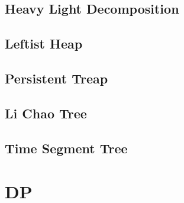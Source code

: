 \documentclass[a4paper,10pt,twocolumn,oneside]{article}
\begin{document}
%

\subsection{Heavy Light Decomposition}


%

% 

\subsection{Leftist Heap}


\subsection{Persistent Treap}


\subsection{Li Chao Tree}


\subsection{Time Segment Tree}





\section{DP}
\end{document}
